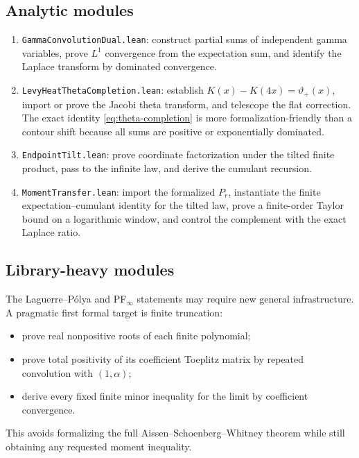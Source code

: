 \documentclass[11pt,oneside]{article}
\theoremstyle{definition}
\theoremstyle{remark}
\begin{document}
\subsection{Analytic modules}

\begin{enumerate}
\item \texttt{GammaConvolutionDual.lean}: construct partial sums of independent
      gamma variables, prove $L^1$ convergence from the expectation sum, and
      identify the Laplace transform by dominated convergence.
\item \texttt{LevyHeatThetaCompletion.lean}: establish
      $K(x)-K(4x)=\vartheta_+(x)$, import or prove the Jacobi theta transform,
      and telescope the flat correction.  The exact identity
      \cref{eq:theta-completion} is more formalization-friendly than a contour
      shift because all sums are positive or exponentially dominated.
\item \texttt{EndpointTilt.lean}: prove coordinate factorization under the
      tilted finite product, pass to the infinite law, and derive the cumulant
      recursion.
\item \texttt{MomentTransfer.lean}: import the formalized \(P_r\), instantiate
      the finite expectation--cumulant identity for the tilted law, prove a
      finite-order Taylor bound on a logarithmic window, and control the
      complement with the exact Laplace ratio.
\end{enumerate}

\subsection{Library-heavy modules}

The Laguerre--P\'olya and PF$_\infty$ statements may require new general
infrastructure.  A pragmatic first formal target is finite truncation:
\begin{itemize}
\item prove real nonpositive roots of each finite polynomial;
\item prove total positivity of its coefficient Toeplitz matrix by repeated
      convolution with $(1,\alpha)$;
\item derive every fixed finite minor inequality for the limit by coefficient
      convergence.
\end{itemize}
This avoids formalizing the full Aissen--Schoenberg--Whitney theorem while
still obtaining any requested moment inequality.
\end{document}
